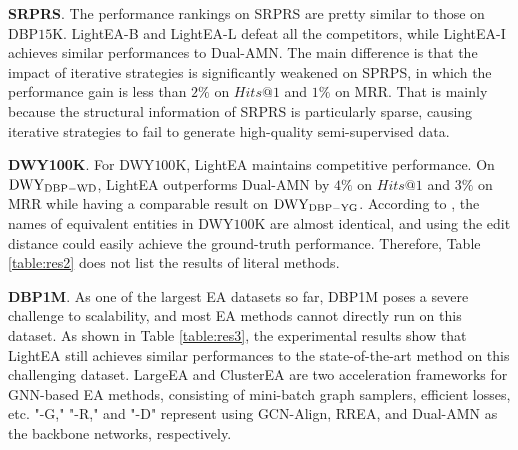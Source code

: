 \documentclass[11pt]{article}
\begin{document}
\noindent
\textbf{SRPRS}.
The performance rankings on SRPRS are pretty similar to those on DBP$15$K.
LightEA-B and LightEA-L defeat all the competitors, while LightEA-I achieves similar performances to Dual-AMN.
The main difference is that the impact of iterative strategies is significantly weakened on SPRPS, in which the performance gain is less than $2\%$ on $Hits@1$ and $1\%$ on MRR.
That is mainly because the structural information of SRPRS is particularly sparse, causing iterative strategies to fail to generate high-quality semi-supervised data.

\noindent
\textbf{DWY100K}.
For DWY$100$K, LightEA maintains competitive performance.
On $\rm DWY_{DBP-WD}$, LightEA outperforms Dual-AMN by $4\%$ on $Hits@1$ and $3\%$ on MRR while having a comparable result on $\rm DWY_{DBP-YG}$.
According to \citet{9174835}, the names of equivalent entities in DWY$100$K are almost identical, and using the edit distance could easily achieve the ground-truth performance.
Therefore, Table \ref{table:res2} does not list the results of literal methods.

\noindent
\textbf{DBP1M}.
As one of the largest EA datasets so far, DBP1M poses a severe challenge to scalability, and most EA methods cannot directly run on this dataset.
As shown in Table \ref{table:res3}, the experimental results show that LightEA still achieves similar performances to the state-of-the-art method on this challenging dataset.
LargeEA and ClusterEA are two acceleration frameworks for GNN-based EA methods, consisting of mini-batch graph samplers, efficient losses, etc.
"-G," "-R," and "-D" represent using GCN-Align, RREA, and Dual-AMN as the backbone networks, respectively.

\begin{table}
\begin{center}
\end{center}
\caption{Time costs on all datasets (seconds). }\label{tabel:time}
\end{table}
\end{document}
